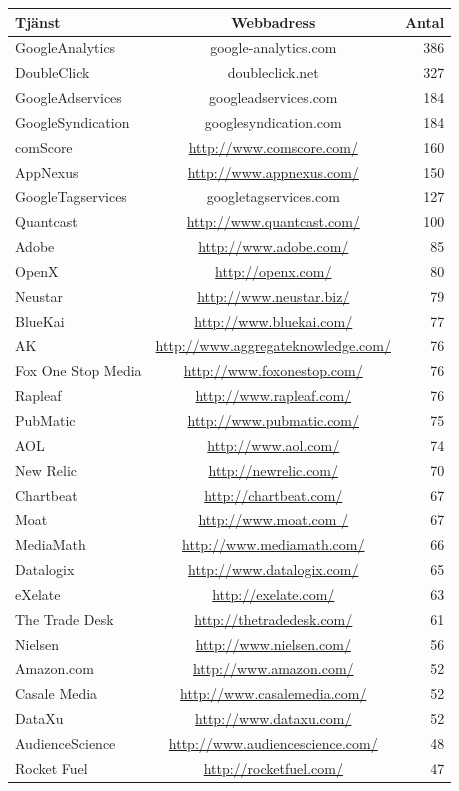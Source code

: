 \documentclass[a4paper,11pt]{article}
\begin{document}
{\begin{thebibliography}{888}
\begin{tabular}{l c r}
	\textbf{Tjänst} & \textbf{Webbadress} & \textbf{Antal}  \\
	\hline
	GoogleAnalytics & google-analytics.com & 386 \\
	DoubleClick	& doubleclick.net &	327 \\
	GoogleAdservices & googleadservices.com & 184 \\
	GoogleSyndication & googlesyndication.com & 184 \\
	comScore	& \url{http://www.comscore.com/} & 160\\
	AppNexus	 &\url{http://www.appnexus.com/} & 150 \\
	GoogleTagservices & googletagservices.com & 127 \\
	Quantcast	 & \url{http://www.quantcast.com/} & 100 \\
	Adobe & \url{http://www.adobe.com/} & 85 \\
	OpenX	& \url{http://openx.com/} & 80 \\
	Neustar & \url{http://www.neustar.biz/} & 79 \\
	BlueKai	& \url{http://www.bluekai.com/} & 77 \\
	AK & \url{http://www.aggregateknowledge.com/} & 76 \\
	Fox One Stop Media & \url{http://www.foxonestop.com/} & 76 \\
	Rapleaf	 & \url{http://www.rapleaf.com/} & 76 \\
 	PubMatic	& \url{http://www.pubmatic.com/} & 75 \\
	AOL	& \url{http://www.aol.com/} & 74 \\
	New Relic	& \url{http://newrelic.com/} & 70 \\
	Chartbeat	& \url{http://chartbeat.com/} & 67 \\
	Moat	 & \url{http://www.moat.com / } & 67 \\
	MediaMath & \url{http://www.mediamath.com/} & 66 \\
	Datalogix	& \url{http://www.datalogix.com/} & 65 \\
	eXelate	& \url{http://exelate.com/} & 63 \\
	The Trade Desk & \url{http://thetradedesk.com/} & 61 \\
	Nielsen	& \url{http://www.nielsen.com/} & 56 \\
	Amazon.com & \url{http://www.amazon.com/} & 52 \\
	Casale Media & \url{http://www.casalemedia.com/} & 52 \\
	DataXu	& \url{http://www.dataxu.com/} & 52 \\
	AudienceScience	& \url{http://www.audiencescience.com/} & 48 \\
	Rocket Fuel	& \url{http://rocketfuel.com/} & 47 \\
\end{tabular}


\end{thebibliography}}
\end{document}
